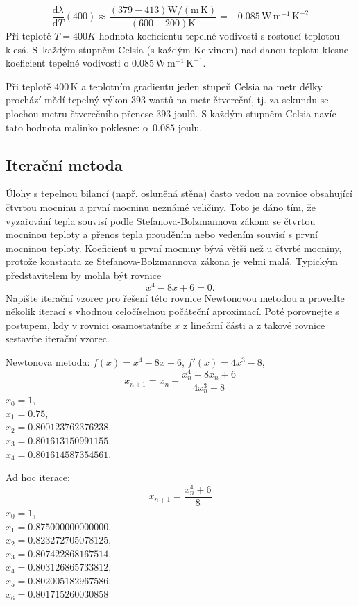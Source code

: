 $$\frac{\mathrm d\lambda}{\mathrm dT}(400) \approx \frac{(379 -413) \mathrm {W}/(\mathrm m\,\mathrm K)}{(600-200)\mathrm K}=-0.085\,\mathrm W \,\mathrm m^{-1}\,\mathrm K^{-2}$$
Při teplotě $T=400 K$ hodnota koeficientu tepelné vodivosti s rostoucí teplotou klesá. S~každým stupněm Celsia (s každým Kelvinem) nad danou teplotu klesne koeficient tepelné vodivosti o $0.085\,\mathrm W \,\mathrm m^{-1}\,\mathrm K^{-1}$.

Při teplotě $400\,\mathrm K$ a teplotním gradientu jeden stupeň Celsia na metr délky prochází mědí tepelný výkon $393$ wattů na metr čtvereční, tj. za sekundu se plochou metru čtverečního přenese $393$ joulů. S každým stupněm Celsia navíc tato hodnota malinko poklesne: o~$0.085$ joulu.
\konec


\stranka

\subsection{Iterační metoda}


Úlohy s tepelnou bilancí (např. osluněná stěna) často vedou na rovnice obsahující čtvrtou mocninu  a první mocninu neznámé veličiny. Toto je dáno tím, že vyzařování tepla souvisí podle Stefanova-Bolzmannova zákona se čtvrtou mocninou teploty  a přenos tepla prouděním nebo vedením souvisí s první mocninou teploty.
Koeficient u první mocniny bývá větší než u čtvrté mocniny, protože konstanta ze Stefanova-Bolzmannova zákona je velmi malá. Typickým představitelem by mohla být rovnice $$x^4-8x+6=0.$$
Napište iterační vzorec pro řešení této rovnice Newtonovou metodou a proveďte několik iterací s vhodnou celočíselnou počáteční aproximací. Poté porovnejte s postupem, kdy v rovnici osamostatníte $x$ z lineární části a z takové rovnice sestavíte iterační vzorec.


\reseni

Newtonova metoda: $f(x)=x^4-8x+6$, $f'(x)=4x^3-8$, $$x_{n+1}=x_n-\frac{x_n^4-8x_n+6}{4x_n^3-8}$$
$x_0=1$,\\ $x_1=0.75$,\\ $x_2=0.800123762376238$,\\ $x_3=0.801613150991155$,\\ $x_4=0.801614587354561$.

Ad hoc iterace: $$x_{n+1}=\frac{x_n^4+6}{8}$$
$x_0=1$,\\ $x_1=0.875000000000000$,\\ $x_2=0.823272705078125$,\\ $x_3=0.807422868167514$,\\ $x_4=0.803126865733812$,\\ $x_5=0.802005182967586$,\\ $x_6=0.801715260030858$

